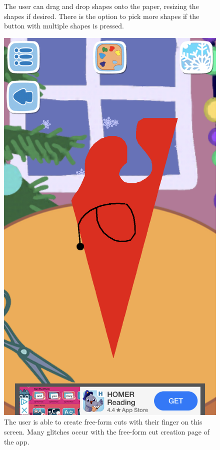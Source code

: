 \documentclass[11pt]{article}
\begin{document}
\begin{figure}[!ht]
\begin{minipage}{0.32\textwidth}
                            \caption{The user can drag and drop shapes onto the paper, resizing the shapes if desired. There is the option to pick more shapes if the button with multiple shapes is pressed.}
                            \label{fig:peppaShapes}
                        \end{minipage}
                        \begin{minipage}{0.32\textwidth}
                            \centering
                            \includegraphics[width=0.8\linewidth]{Images/peppa/peppaFreeFormCut.PNG}
                             \caption{The user is able to create free-form cuts with their finger on this screen. Many glitches occur with the free-form cut creation page of the app.}
                            \label{fig:peppaFreeFormCut}

\end{minipage}
\end{figure}
\end{document}
